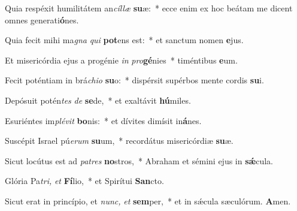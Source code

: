 \item Quia respéxit humilitátem an\textit{cíllæ} \textbf{su}æ:~* ecce enim ex hoc beátam me dicent omnes generati\textbf{ó}nes.
\item Quia fecit mihi ma\textit{gna} \textit{qui} \textbf{pot}ens est:~* et san\-ctum nomen \textbf{e}jus.
\item Et misericórdia ejus a progénie \textit{in} \textit{pro}\textbf{gé}nies~* timéntibus \textbf{e}um.
\item Fecit poténtiam in brá\textit{chio} \textbf{su}o:~* dispérsit supérbos mente cordis \textbf{su}i.
\item Depósuit potén\textit{tes} \textit{de} \textbf{se}de,~* et exaltávit \textbf{hú}miles.
\item Esuriéntes im\textit{plévit} \textbf{bo}nis:~* et dívites dimísit in\textbf{á}nes.
\item Suscépit Israel pú\textit{erum} \textbf{su}um,~* recordátus misericórdiæ \textbf{su}æ.
\item Sicut locútus est ad \textit{patres} \textbf{no}stros,~* Abraham et sémini ejus in \textbf{sǽ}cula.
\item Glória Pa\teenyhspace\textit{tri,} \textit{et} \textbf{Fí}lio,~* et Spirítui \textbf{San}cto.
\item Sicut erat in princípio, et \textit{nunc,} \textit{et} \textbf{sem}per,~* et in sǽcula sæculórum. \textbf{A}men.